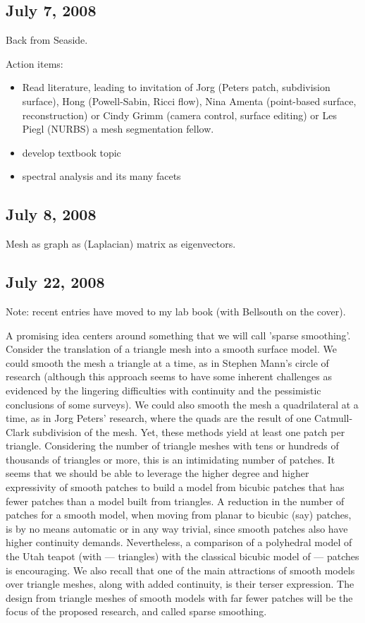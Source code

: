 \documentclass[11pt]{article}
\begin{document}
\subsection{July 7, 2008}

Back from Seaside.

Action items:
\begin{itemize}
\item Read literature, leading to invitation of 
  Jorg (Peters patch, subdivision surface), 
  Hong (Powell-Sabin, Ricci flow), 
  Nina Amenta (point-based surface, reconstruction) or 
  Cindy Grimm (camera control, surface editing) or
  Les Piegl (NURBS)
  a mesh segmentation fellow.

\item develop textbook topic

\item spectral analysis and its many facets
\end{itemize}

\subsection{July 8, 2008}

Mesh as graph as (Laplacian) matrix as eigenvectors.

\subsection{July 22, 2008}

Note: recent entries have moved to my lab book 
(with Bellsouth on the cover).

A promising idea centers around something that we will call 'sparse smoothing'.
Consider the translation of a triangle mesh into a smooth surface model.
We could smooth the mesh a triangle at a time, as in Stephen Mann's
circle of research
(although this approach seems to have some inherent challenges
as evidenced by the lingering difficulties with continuity and the pessimistic
conclusions of some surveys).
We could also smooth the mesh
a quadrilateral at a time, as in Jorg Peters' research,
where the quads are the result of one Catmull-Clark subdivision of the mesh.
Yet, these methods yield at least one patch per triangle.
Considering the number of triangle meshes with tens or hundreds of thousands of
triangles or more, this is an intimidating number of patches.
It seems that we should be able to leverage the higher degree and
higher expressivity of smooth patches to build a model 
from bicubic patches that has fewer patches
than a model built from triangles.
A reduction in the number of patches for a smooth model,
when moving from planar to bicubic (say) patches, is by no means automatic 
or in any way trivial, since smooth patches also have higher continuity demands.
Nevertheless, a comparison of a polyhedral model of the Utah teapot (with --- triangles)
with the classical bicubic model of --- patches is encouraging.
We also recall that one of the main attractions of smooth models
over triangle meshes,
along with added continuity, is their terser expression.
The design from triangle meshes of smooth models with far fewer patches
will be the focus of the proposed research, and called sparse smoothing.
\end{document}
